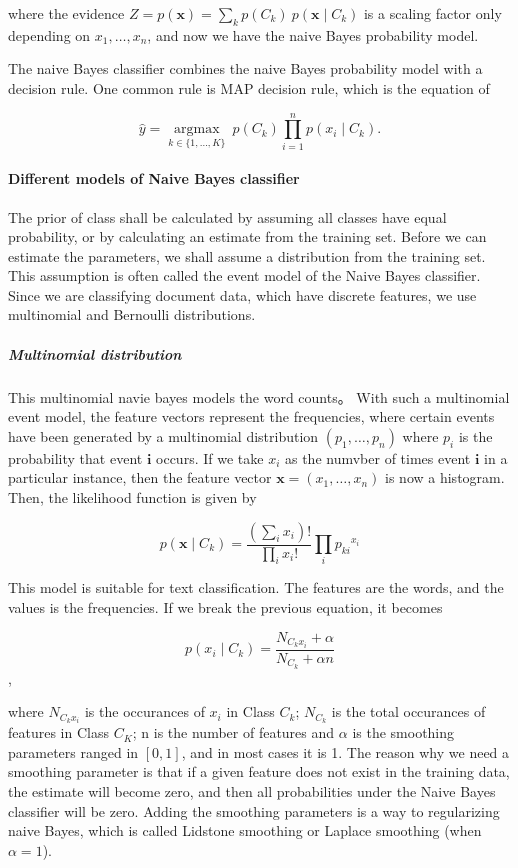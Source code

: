 \documentclass[12pt,a4paper]{report}
\begin{document}
        where the evidence $Z = p(\mathbf{x}) = \sum_k p(C_k) \ p(\mathbf{x} \mid C_k)$ is a scaling factor only depending on $x_1, \dots, x_n$, and now we have the naive Bayes probability model.

        The naive Bayes classifier combines the naive Bayes probability model with a decision rule.  One common rule is MAP decision rule, which is the equation of

        \[
          \hat{y} = \underset{k \in \{1, \dots, K\}}{\operatorname{argmax}} \ p(C_k) \displaystyle\prod_{i=1}^n p(x_i \mid C_k).
        \]

        \paragraph{Different models of Naive Bayes classifier}

          The prior of class shall be calculated by assuming all classes have equal probability, or by calculating an estimate from the training set. Before we can estimate the parameters, we shall assume a distribution from the training set. This assumption is often called the event model of the Naive Bayes classifier. Since we are classifying document data, which have discrete features, we use multinomial and Bernoulli distributions.

          \subparagraph{Multinomial distribution}

          This multinomial navie bayes models the word counts。 With such a multinomial event model, the feature vectors represent the frequencies, where certain events have been generated by a multinomial distribution $(p_1, \dots, p_n)$ where $p_i$ is the probability that event $\mathbf{i}$ occurs. If we take $x_i$ as the numvber of times event $\mathbf{i}$ in a particular instance, then the feature vector $\mathbf{x} = (x_1, \dots, x_n)$ is now a histogram. Then, the likelihood function is given by

          $$
            p(\mathbf{x} \mid C_k) = \frac{(\sum_i x_i)!}{\prod_i x_i !} \prod_i {p_{ki}}^{x_i}
          $$

          This model is suitable for text classification. The features are the words, and the values is the frequencies. If we break the previous equation, it becomes

          $$
            p(x_i \mid C_k) = \frac{N_{C_kx_i} + \alpha}{N_{C_k} + \alpha n}
          $$,

          where $N_{C_kx_i}$ is the occurances of $x_i$ in Class $C_k$; $N_{C_k}$ is the total occurances of features in Class $C_K$; n is the number of features and $\alpha$ is the smoothing parameters ranged in $[0, 1]$, and in most cases it is 1. The reason why we need a smoothing parameter is that if a given feature does not exist in the training data, the estimate will become zero, and then all probabilities under the Naive Bayes classifier will be zero. Adding the smoothing parameters is a way to regularizing naive Bayes, which is called Lidstone smoothing or Laplace smoothing (when $\alpha=1$).
\end{document}
